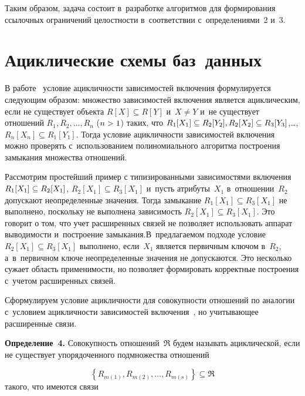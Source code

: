 \begin{multicols}{2}
  Таким образом, задача состоит в~разработке алгоритмов для формирования
ссылочных ограничений целостности в~соответствии с~определениями~2 и~3.

\vspace*{-6pt}


\section{Ациклические схемы баз~данных}

  В работе~\cite{6-z} условие ацикличности зависимостей включения
формулируется следующим образом: множество зависимостей включения
является ациклическим, если не существует объекта $R[X]\subseteq R[Y]$
и~$X\not= Y$ и~не существует отношений $R_1, R_2, \ldots, R_n$ ($n\hm>1$)
таких, что $R_1[X_1]\hm\subseteq R_2[Y_2], R_2[X_2]\subseteq R_3[Y_3]$,\ldots ,
$R_n[X_n]\subseteq R_1[Y_1]$. Тогда условие ацикличности зависимостей
включения можно проверять с~использованием полиномиального алгоритма
построения замыкания множества отношений. 

Рассмотрим простейший пример
с типизированными зависимостями включения $R_1[X_1]\hm\subseteq R_2[X_1]$,
$R_2[X_1]\subseteq R_3[X_1]$ и~пусть атрибуты~$X_1$ в~отношении~$R_2$
допускают неопределенные значения. Тогда замыкание $R_1[X_1]\subseteq
R_3[X_1]$ не выполнено, поскольку не выполнена зависимость\linebreak
$R_2[X_1]\subseteq R_3[X_1]$. Это говорит о том, что учет расширенных
связей не позволяет использовать ап\-парат выводимости и~построение
замыкания.\linebreak В~предлагаемом подходе условие $R_2[X_1]\subseteq R_3[X_1]$
выполнено, если~$X_1$ является первичным ключом в~$R_2$, а~в~первичном
ключе неопределенные значения не допускаются. Это несколько сужает
область применимости, но позволяет формировать корректные построения с~учетом расширенных связей.

  Сформулируем условие ацикличности для совокупности отношений по
аналогии с~условием ацик\-лич\-ности зависимостей включения~\cite{6-z}, но
учитывающее расширенные связи.

  \smallskip

  \noindent
  \textbf{Определение~4.} Совокупность отношений~$\mathfrak{R}$ будем
называть ациклической, если не существует упорядоченного подмножества
отношений

\noindent
  \begin{equation*}
  \left\{ R_{m(1)}, R_{m(2)}, \ldots, R_{m(s)} \right\} \subseteq \mathfrak{R}
  \end{equation*}
такого, что имеются связи


\end{multicols}
